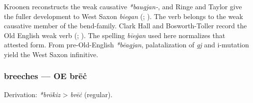 \documentclass[
  british,
  a4paper,
]{article}
\begin{document}
Kroonen reconstructs the weak causative \emph{*baugjan-}, and Ringe and
Taylor give the fuller development to West Saxon \emph{biegan}
(;
). The verb
belongs to the weak causative member of the bend-family. Clark Hall and
Bosworth-Toller record the Old English weak verb
(;
). The
spelling \emph{bīeġan} used here normalizes that attested form. From
pre-Old-English \emph{*bēagjan}, palatalization of \emph{gj} and
i-mutation yield the West Saxon infinitive.

\subsubsection{breeches --- OE brēċ}\label{breeches-oe-brux113ux10b}

Derivation: \emph{*brōkiz} \textgreater{} \emph{brēċ} (regular).

\begingroup
\setlength{\fboxsep}{6pt}
\end{document}
